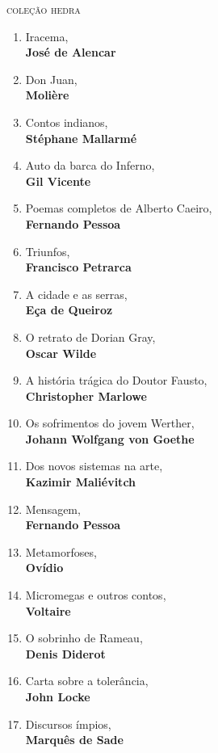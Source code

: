 \ifodd\thepage\paginabranca\else\clearpage\fi
\pagestyle{empty}

\begingroup
\small
{\large\textsc{coleção hedra}}\\
\begin{enumerate} [font=\Formular\footnotesize]
\setlength\parskip{4.2pt}
\setlength\itemsep{-1.4mm}
\item Iracema,\\ \textbf{José de Alencar}
\item Don Juan,\\ \textbf{Molière}
\item Contos indianos,\\ \textbf{Stéphane Mallarmé}
\item Auto da barca do Inferno,\\ \textbf{Gil Vicente}
\item Poemas completos de Alberto Caeiro,\\ \textbf{Fernando Pessoa}
\item Triunfos,\\ \textbf{Francisco Petrarca}
\item A cidade e as serras,\\ \textbf{Eça de Queiroz}
\item O retrato de Dorian Gray,\\ \textbf{Oscar Wilde}
\item A história trágica do Doutor Fausto,\\ \textbf{Christopher Marlowe}
\item Os sofrimentos do jovem Werther,\\ \textbf{Johann Wolfgang von Goethe}
\item Dos novos sistemas na arte,\\ \textbf{Kazimir Maliévitch}
\item Mensagem,\\ \textbf{Fernando Pessoa}
\item Metamorfoses,\\ \textbf{Ovídio}
\item Micromegas e outros contos,\\ \textbf{Voltaire}
\item O sobrinho de Rameau,\\ \textbf{Denis Diderot}
\item Carta sobre a tolerância,\\ \textbf{John Locke}
\item Discursos ímpios,\\ \textbf{Marquês de Sade}

\end{enumerate}
